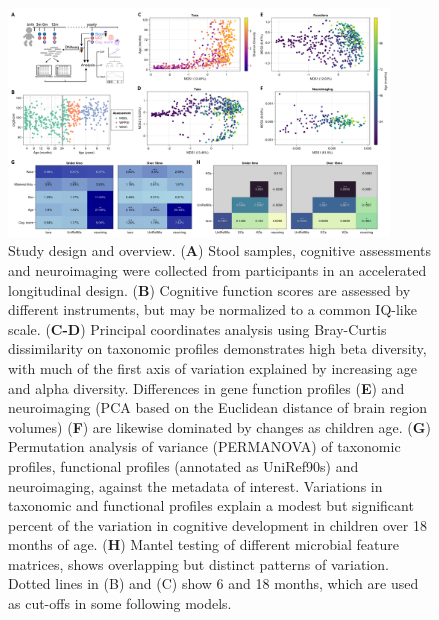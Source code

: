 \documentclass{article}
\begin{document}
\begin{figure}
    \centering
    \includegraphics[width=0.9\textwidth]{assets/Figure1.png}
    \caption{
        \label{fig:1} Study design and overview. (\textbf{A}) Stool samples, cognitive assessments and
        neuroimaging were collected from participants in an accelerated
        longitudinal design. (\textbf{B}) Cognitive function scores are assessed by
        different instruments, but may be normalized to a common IQ-like scale.
        (\textbf{C-D}) Principal coordinates analysis using Bray-Curtis dissimilarity on
        taxonomic profiles demonstrates high beta diversity, with much of the
        first axis of variation explained by increasing age and alpha diversity.
        Differences in gene function profiles (\textbf{E}) and neuroimaging (PCA based on
        the Euclidean distance of brain region volumes) (\textbf{F}) are likewise
        dominated by changes as children age. (\textbf{G}) Permutation analysis of
        variance (PERMANOVA) of taxonomic profiles, functional profiles
        (annotated as UniRef90s) and neuroimaging, against the metadata of
        interest. Variations in taxonomic and functional profiles explain a
        modest but significant percent of the variation in cognitive development
        in children over 18 months of age. (\textbf{H}) Mantel testing of different
        microbial feature matrices, shows overlapping but distinct patterns of
        variation. Dotted lines in (B) and (C) show 6 and 18 months, which are
        used as cut-offs in some following models.
    }

\end{figure}
\end{document}
